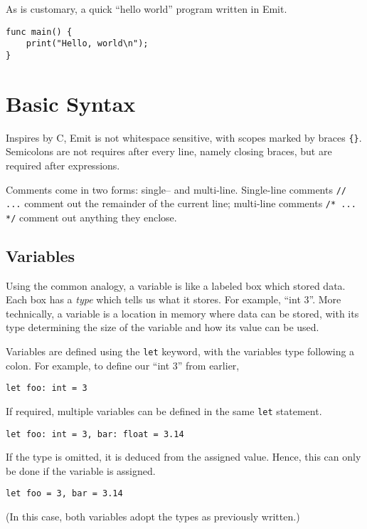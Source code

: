 \documentclass{article}
\begin{document}
    As is customary, a quick ``hello world'' program written in Emit.

    \begin{lstlisting}[language=CustomLang]
func main() {
    print("Hello, world\n");
}
    \end{lstlisting}

    \section{Basic Syntax}\label{sec:basic-syntax}

    Inspires by C, Emit is not whitespace sensitive, with scopes marked by braces \texttt{\{\}}.
    Semicolons are not requires after every line, namely closing braces, but are required after expressions.

    Comments come in two forms: single-- and multi-line.
    Single-line comments \texttt{// ...} comment out the remainder of the current line;
    multi-line comments \texttt{/* ... */} comment out anything they enclose.

    \subsection{Variables}\label{subsec:variables-&-assignment}

    Using the common analogy, a variable is like a labeled box which stored data.
    Each box has a \textit{type} which tells us what it stores.
    For example, ``int 3''.
    More technically, a variable is a location in memory where data can be stored, with its type determining the size of the variable and how its value can be used.

    Variables are defined using the \texttt{let} keyword, with the variables type following a colon.
    For example, to define our ``int 3'' from earlier,
    \begin{lstlisting}[language=CustomLang]
let foo: int = 3
    \end{lstlisting}

    If required, multiple variables can be defined in the same \texttt{let} statement.
    \begin{lstlisting}[language=CustomLang]
let foo: int = 3, bar: float = 3.14
    \end{lstlisting}

    If the type is omitted, it is deduced from the assigned value.
    Hence, this can only be done if the variable is assigned.
    \begin{lstlisting}[language=CustomLang]
let foo = 3, bar = 3.14
    \end{lstlisting}
    (In this case, both variables adopt the types as previously written.)
\end{document}
